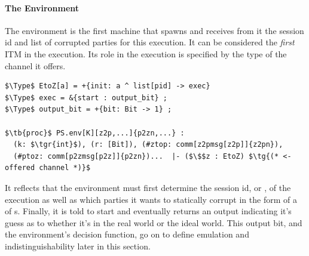 \paragraph{The Environment}
The environment is the first machine that  spawns and receives from it the session id and list of corrupted parties for this execution. 
It can be considered the \emph{first} ITM in the execution.
Its role in the execution is specified by the type  of the channel it offers.
\begin{lstlisting}[basicstyle=\footnotesize\BeraMonottFamily, mathescape, frame=single]
$\Type$ EtoZ[a] = +{init: a ^ list[pid] -> exec} 
$\Type$ exec = &{start : output_bit} ;
$\Type$ output_bit = +{bit: Bit -> 1} ;

$\tb{proc}$ PS.env[K][z2p,...]{p2zn,...} : 
  (k: $\tgr{int}$), (r: [Bit]), (#ztop: comm[z2pmsg[z2p]]{z2pn}), 
  (#ptoz: comm[p2zmsg[p2z]]{p2zn})...  |- ($\$$z : EtoZ) $\tg{(* <- offered channel *)}$
\end{lstlisting}
It reflects that the environment must first determine the session id, or , of the execution as well as which parties it wants to statically corrupt in the form of a  of s.
Finally, it is told to start and eventually returns an output  indicating it's guess as to whether it's in the real world or the ideal world.
This output bit, and the environment's decision function, go on to define emulation and indistinguishability later in this section. 


